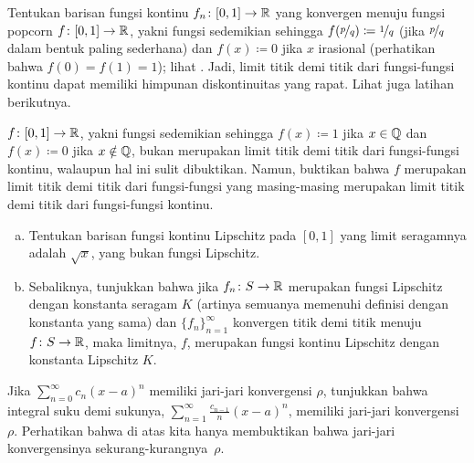 \begin{exercise}[Menantang]
Tentukan barisan fungsi kontinu $f_n \colon [0,1] \to {\mathbb{R}}$ yang
konvergen menuju fungsi popcorn $f \colon [0,1] \to {\mathbb{R}}$, yakni
fungsi sedemikian sehingga $f(\nicefrac{p}{q}) \coloneqq \nicefrac{1}{q}$ (jika $\nicefrac{p}{q}$
dalam bentuk paling sederhana) dan $f(x) \coloneqq 0$ jika $x$ irasional (perhatikan
bahwa $f(0) = f(1) = 1$);
lihat .
Jadi, limit titik demi titik dari fungsi-fungsi kontinu dapat memiliki himpunan
diskontinuitas yang rapat.  Lihat juga latihan berikutnya.
\end{exercise}

\begin{exercise}[Menantang]
$f \colon [0,1] \to {\mathbb{R}}$, yakni
fungsi sedemikian sehingga $f(x) \coloneqq 1$ jika $x \in {\mathbb{Q}}$
dan $f(x) \coloneqq 0$ jika $x \notin {\mathbb{Q}}$,
bukan merupakan limit titik demi titik dari
fungsi-fungsi kontinu, walaupun hal ini sulit dibuktikan.
Namun, buktikan bahwa $f$ merupakan limit titik demi titik dari fungsi-fungsi yang masing-masing
merupakan limit titik demi titik dari
fungsi-fungsi kontinu.
\end{exercise}

\begin{exercise}
\leavevmode
\begin{enumerate}[a)]
\item
Tentukan barisan fungsi kontinu Lipschitz pada $[0,1]$
yang limit seragamnya adalah $\sqrt{x}$, yang bukan fungsi Lipschitz.
\item
Sebaliknya, tunjukkan bahwa jika $f_n \colon S \to {\mathbb{R}}$ merupakan fungsi Lipschitz
dengan konstanta seragam $K$ (artinya semuanya memenuhi definisi
dengan konstanta yang sama) dan $\{ f_n \}_{n=1}^\infty$ konvergen titik demi titik
menuju $f \colon S \to {\mathbb{R}}$,
maka limitnya, $f$, merupakan fungsi kontinu Lipschitz
dengan konstanta Lipschitz $K$.
\end{enumerate}
\end{exercise}

\begin{exercise}
Jika $\sum_{n=0}^\infty c_n {(x-a)}^n$ memiliki jari-jari konvergensi $\rho$,
tunjukkan bahwa integral suku demi sukunya,
$\sum_{n=1}^\infty \frac{c_{n-1}}{n} {(x-a)}^n$, memiliki jari-jari konvergensi
$\rho$.  Perhatikan bahwa di atas kita hanya membuktikan bahwa jari-jari konvergensinya
sekurang-kurangnya~$\rho$.
\end{exercise}

